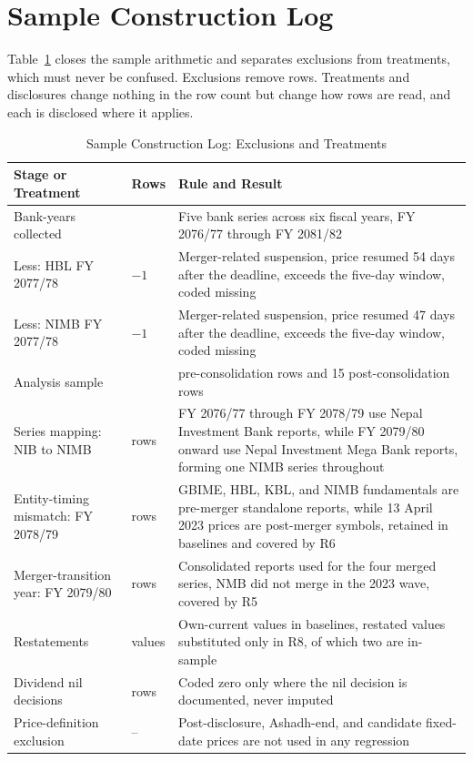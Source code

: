 \section{Sample Construction Log}

Table~\ref{tab:app_sample} closes the sample arithmetic and separates exclusions from treatments, which must never be confused. Exclusions remove rows. Treatments and disclosures change nothing in the row count but change how rows are read, and each is disclosed where it applies.

\begin{table}[!htbp]
\centering
\small
\setlength{\tabcolsep}{4pt}
\caption{Sample Construction Log: Exclusions and Treatments}
\label{tab:app_sample}
\begin{tabular}{>{\raggedright\arraybackslash}p{}>{\raggedright\arraybackslash}p{}>{\raggedright\arraybackslash}p{}}
\toprule
\textbf{Stage or Treatment} & \textbf{Rows} & \textbf{Rule and Result} \\
\midrule
Bank-years collected & 30 & Five bank series across six fiscal years, FY 2076/77 through FY 2081/82 \\
\addlinespace
Less: HBL FY 2077/78 & $-1$ & Merger-related suspension, price resumed 54 days after the deadline, exceeds the five-day window, coded missing \\
\addlinespace
Less: NIMB FY 2077/78 & $-1$ & Merger-related suspension, price resumed 47 days after the deadline, exceeds the five-day window, coded missing \\
\addlinespace
Analysis sample & 28 & 13 pre-consolidation rows and 15 post-consolidation rows \\
\midrule
Series mapping: NIB to NIMB & 6 rows & FY 2076/77 through FY 2078/79 use Nepal Investment Bank reports, while FY 2079/80 onward use Nepal Investment Mega Bank reports, forming one NIMB series throughout \\
\addlinespace
Entity-timing mismatch: FY 2078/79 & 4 rows & GBIME, HBL, KBL, and NIMB fundamentals are pre-merger standalone reports, while 13 April 2023 prices are post-merger symbols, retained in baselines and covered by R6 \\
\addlinespace
Merger-transition year: FY 2079/80 & 5 rows & Consolidated reports used for the four merged series, NMB did not merge in the 2023 wave, covered by R5 \\
\addlinespace
Restatements & 3 values & Own-current values in baselines, restated values substituted only in R8, of which two are in-sample \\
\addlinespace
Dividend nil decisions & 12 rows & Coded zero only where the nil decision is documented, never imputed \\
\addlinespace
Price-definition exclusion & -- & Post-disclosure, Ashadh-end, and candidate fixed-date prices are not used in any regression \\
\bottomrule
\end{tabular}


\end{table}
